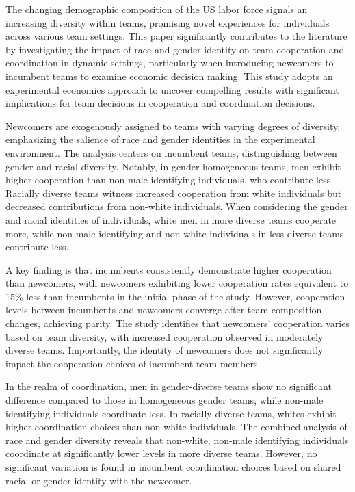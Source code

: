 The changing demographic composition of the US labor force signals an increasing diversity within teams, promising novel experiences for individuals across various team settings. This paper significantly contributes to the literature by investigating the impact of race and gender identity on team cooperation and coordination in dynamic settings, particularly when introducing newcomers to incumbent teams to examine economic decision making.  This study adopts an experimental economics approach to uncover compelling results with significant implications for team decisions in cooperation and coordination decisions. 

Newcomers are exogenously assigned to teams with varying degrees of diversity, emphasizing the salience of race and gender identities in the experimental environment. The analysis centers on incumbent teams, distinguishing between gender and racial diversity. Notably, in gender-homogeneous teams, men exhibit higher cooperation than non-male identifying individuals, who contribute less. Racially diverse teams witness increased cooperation from white individuals but decreased contributions from non-white individuals. When considering the gender and racial identities of individuals, white men in more diverse teams cooperate more, while non-male identifying and non-white individuals in less diverse teams contribute less.

A key finding is that incumbents consistently demonstrate higher cooperation than newcomers, with newcomers exhibiting lower cooperation rates equivalent to 15\% less than incumbents in the initial phase of the study. However, cooperation levels between incumbents and newcomers converge after team composition changes, achieving parity. The study identifies that newcomers' cooperation varies based on team diversity, with increased cooperation observed in moderately diverse teams. Importantly, the identity of newcomers does not significantly impact the cooperation choices of incumbent team members.

In the realm of coordination, men in gender-diverse teams show no significant difference compared to those in homogeneous gender teams, while non-male identifying individuals coordinate less. In racially diverse teams, whites exhibit higher coordination choices than non-white individuals. The combined analysis of race and gender diversity reveals that non-white, non-male identifying individuals coordinate at significantly lower levels in more diverse teams. However, no significant variation is found in incumbent coordination choices based on shared racial or gender identity with the newcomer.  

